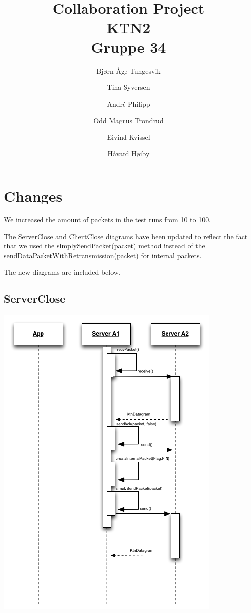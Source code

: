 \documentclass{article}
\begin{document}
\begin{titlepage}
\title{Collaboration Project\\
\textbf{KTN2}\\
Gruppe 34}
\author{Bj\o rn \AA ge Tungesvik\and Tina Syversen\and Andr\'e Philipp\and Odd Magnus Trondrud\and Eivind Kvissel\and H\aa vard H\o iby}
\maketitle
\end{titlepage}\newpage %

\newpage

\section{Changes}

We increased the amount of packets in the test runs from 10 to 100.

The ServerClose and ClientClose diagrams have been updated to reflect the
fact that we used the simplySendPacket(packet) method instead of the
sendDataPacketWithRetransmission(packet) for internal packets.

The new diagrams are included below.

\subsection{ServerClose}

\includegraphics[scale=1]{ktnServerClose.png}
\end{document}
